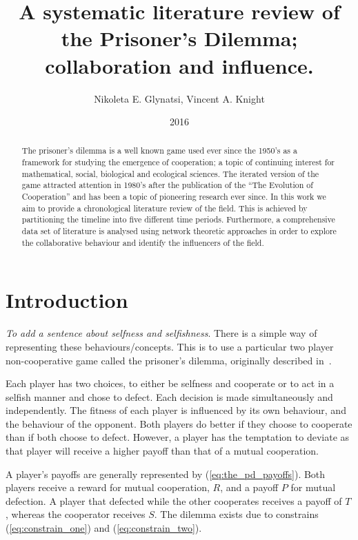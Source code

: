 \documentclass{article}
\title{A systematic literature review of the Prisoner's Dilemma; collaboration and influence.}
\author{Nikoleta E. Glynatsi, Vincent A. Knight}
\date{2016}
\theoremstyle{definition}
\begin{document}
\maketitle

\begin{abstract}
    The prisoner's dilemma is a well known game used ever since the 1950's as a framework
    for studying the emergence of cooperation; a topic of continuing interest
    for mathematical, social, biological and ecological sciences. The iterated version
    of the game attracted attention in 1980's after
    the publication of the ``The Evolution of Cooperation'' and has been a topic
    of pioneering research ever since. In this work we aim to provide a chronological
    literature review of the field. This is achieved by partitioning the timeline into five different
    time periods. Furthermore, a comprehensive data set of literature is analysed
    using network theoretic approaches in order to explore the collaborative
    behaviour and identify the influencers of the field.
\end{abstract}

\section{Introduction}\label{section:introduction}

\textit{To add a sentence about selfness and selfishness}. There is a simple
way of representing these behaviours/concepts. This is to use a
particular two player non-cooperative game called the prisoner's dilemma, originally
described in~\cite{Flood1958}.

Each player has two choices, to either be selfness and cooperate or to act in a
selfish manner and chose to defect. Each decision is made simultaneously and independently.
The fitness of each player is influenced by its own behaviour, and the behaviour
of the opponent. Both players do better if they choose to cooperate than if both
choose to defect. However, a player has the temptation to deviate as that player will
receive a higher payoff than that of a mutual cooperation.

A player's payoffs are generally represented by (\ref{eq:the_pd_payoffs}). Both
players receive a reward for mutual cooperation, \(R\), and a payoff \(P\) for
mutual defection. A player that defected while the other cooperates receives a payoff of
\(T\), whereas the cooperator receives \(S\). The dilemma exists due
to constrains (\ref{eq:constrain_one}) and (\ref{eq:constrain_two}).
\end{document}
